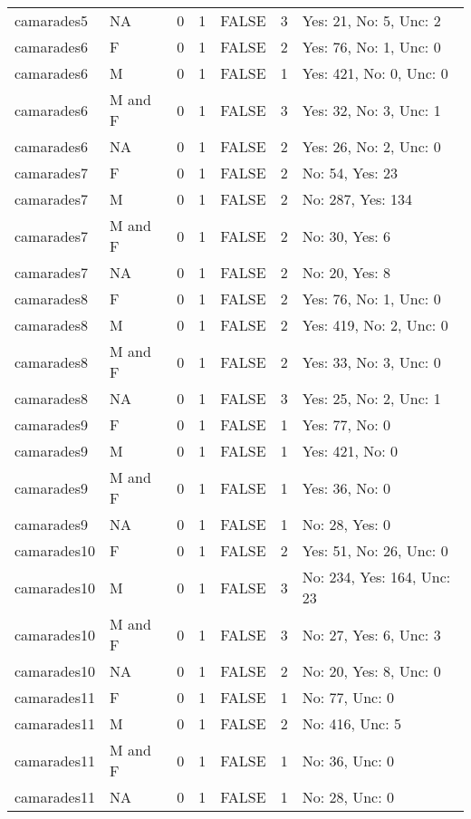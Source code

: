 \documentclass[
]{article}
\begin{document}
\begin{longtable}[]{@{}llrrlrl@{}}
camarades5 & NA & 0 & 1 & FALSE & 3 & Yes: 21, No: 5, Unc: 2 \\
camarades6 & F & 0 & 1 & FALSE & 2 & Yes: 76, No: 1, Unc: 0 \\
camarades6 & M & 0 & 1 & FALSE & 1 & Yes: 421, No: 0, Unc: 0 \\
camarades6 & M and F & 0 & 1 & FALSE & 3 & Yes: 32, No: 3, Unc: 1 \\
camarades6 & NA & 0 & 1 & FALSE & 2 & Yes: 26, No: 2, Unc: 0 \\
camarades7 & F & 0 & 1 & FALSE & 2 & No: 54, Yes: 23 \\
camarades7 & M & 0 & 1 & FALSE & 2 & No: 287, Yes: 134 \\
camarades7 & M and F & 0 & 1 & FALSE & 2 & No: 30, Yes: 6 \\
camarades7 & NA & 0 & 1 & FALSE & 2 & No: 20, Yes: 8 \\
camarades8 & F & 0 & 1 & FALSE & 2 & Yes: 76, No: 1, Unc: 0 \\
camarades8 & M & 0 & 1 & FALSE & 2 & Yes: 419, No: 2, Unc: 0 \\
camarades8 & M and F & 0 & 1 & FALSE & 2 & Yes: 33, No: 3, Unc: 0 \\
camarades8 & NA & 0 & 1 & FALSE & 3 & Yes: 25, No: 2, Unc: 1 \\
camarades9 & F & 0 & 1 & FALSE & 1 & Yes: 77, No: 0 \\
camarades9 & M & 0 & 1 & FALSE & 1 & Yes: 421, No: 0 \\
camarades9 & M and F & 0 & 1 & FALSE & 1 & Yes: 36, No: 0 \\
camarades9 & NA & 0 & 1 & FALSE & 1 & No: 28, Yes: 0 \\
camarades10 & F & 0 & 1 & FALSE & 2 & Yes: 51, No: 26, Unc: 0 \\
camarades10 & M & 0 & 1 & FALSE & 3 & No: 234, Yes: 164, Unc: 23 \\
camarades10 & M and F & 0 & 1 & FALSE & 3 & No: 27, Yes: 6, Unc: 3 \\
camarades10 & NA & 0 & 1 & FALSE & 2 & No: 20, Yes: 8, Unc: 0 \\
camarades11 & F & 0 & 1 & FALSE & 1 & No: 77, Unc: 0 \\
camarades11 & M & 0 & 1 & FALSE & 2 & No: 416, Unc: 5 \\
camarades11 & M and F & 0 & 1 & FALSE & 1 & No: 36, Unc: 0 \\
camarades11 & NA & 0 & 1 & FALSE & 1 & No: 28, Unc: 0 \\
\bottomrule
\end{longtable}
\end{document}

